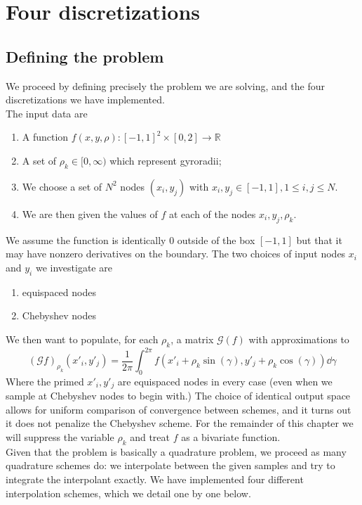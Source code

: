 \chapter{Four discretizations\label{chap:one}}

\section{Defining the problem\label{sec:ProblemDefinition}}
We proceed by defining precisely the problem we are solving, and the four discretizations we have implemented.\\

The input data are 
\begin{enumerate}
	\item A function $f(x,y,\rho) : [-1,1]^2 \times [0,2]  \to \mathbb{R}$
	\item A set of $\rho_k \in [0,\infty)$ which represent gyroradii;
	\item  We choose a set of $N^2$ nodes $(x_i,y_j)$ with $x_i, y_j\in [-1,1], 1 \leq i,j \leq N$.   
	\item We are then given the values of $f$ at each of the nodes $x_i,y_j,\rho_k$. 
\end{enumerate}

    We assume the function is identically $0$ outside of the box $[-1,1]$ but that it may have nonzero derivatives on the boundary.  The two choices of input nodes $x_i$ and $y_i$ we investigate are 
    \begin{enumerate}
    	\item equispaced nodes
    	\item Chebyshev nodes
    \end{enumerate} 

We then want to populate, for each $\rho_k$, a matrix $\mathcal{G}(f)$ with approximations to 
\[ (\mathcal{G}f)_{\rho_k}(x'_i,y'_j) = \frac{1}{2 \pi}\int_{0}^{2\pi} f(x'_i+\rho_k \sin(\gamma), y'_j + \rho_k \cos(\gamma)) \dd{\gamma}\]
Where the primed $x'_i, y'_j$ are equispaced nodes in every case (even when we sample at Chebyshev nodes to begin with.)  The choice of identical output space allows for uniform comparison of convergence between schemes, and it turns out it does not penalize the Chebyshev scheme.  For the remainder of this chapter we will suppress the variable $\rho_k$ and treat $f$ as a bivariate function.\\

Given that the problem is basically a quadrature problem, we proceed as many quadrature schemes do: we interpolate between the given samples and try to integrate the interpolant exactly.  We have implemented four different interpolation schemes, which we detail one by one below.

